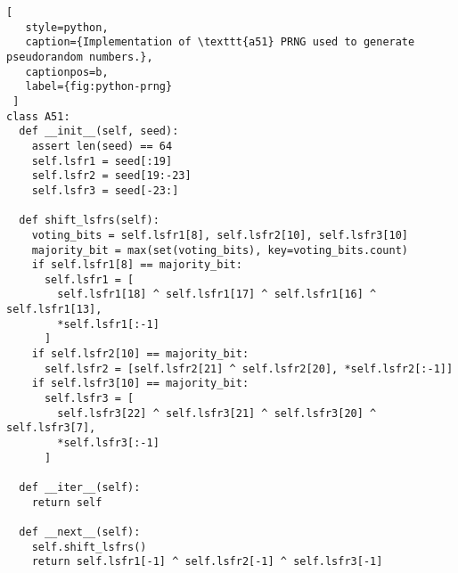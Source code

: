 \begin{minipage}{\linewidth}
  \begin{lstlisting}[
   style=python,
   caption={Implementation of \texttt{a51} PRNG used to generate pseudorandom numbers.},
   captionpos=b,
   label={fig:python-prng}
 ]
class A51:
  def __init__(self, seed):
    assert len(seed) == 64
    self.lsfr1 = seed[:19]
    self.lsfr2 = seed[19:-23]
    self.lsfr3 = seed[-23:]

  def shift_lsfrs(self):
    voting_bits = self.lsfr1[8], self.lsfr2[10], self.lsfr3[10]
    majority_bit = max(set(voting_bits), key=voting_bits.count)
    if self.lsfr1[8] == majority_bit:
      self.lsfr1 = [
        self.lsfr1[18] ^ self.lsfr1[17] ^ self.lsfr1[16] ^ self.lsfr1[13],
        *self.lsfr1[:-1]
      ]
    if self.lsfr2[10] == majority_bit:
      self.lsfr2 = [self.lsfr2[21] ^ self.lsfr2[20], *self.lsfr2[:-1]]
    if self.lsfr3[10] == majority_bit:
      self.lsfr3 = [
        self.lsfr3[22] ^ self.lsfr3[21] ^ self.lsfr3[20] ^ self.lsfr3[7],
        *self.lsfr3[:-1]
      ]

  def __iter__(self):
    return self

  def __next__(self):
    self.shift_lsfrs()
    return self.lsfr1[-1] ^ self.lsfr2[-1] ^ self.lsfr3[-1]
  \end{lstlisting}
\end{minipage}